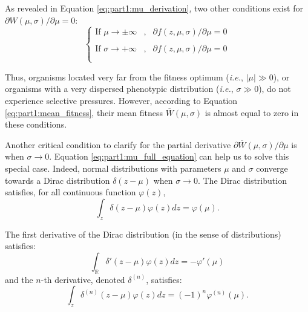 As revealed in Equation \ref{eq:part1:mu_derivation}, two other conditions exist for $\partial W(\mu,\sigma)/\partial \mu = 0$:
\begin{equation}
\left\{
\begin{array}{rcl}
\text{If } \mu \rightarrow \pm \infty &,& \partial f(z,\mu,\sigma)/\partial \mu = 0\\\\
\text{If } \sigma \rightarrow +\infty &,& \partial f(z,\mu,\sigma)/\partial \mu = 0\\\\
\end{array}
\right.
\end{equation}

Thus, organisms located very far from the fitness optimum (\textit{i.e.}, $|\mu| \gg 0$), or organisms with a very dispersed phenotypic distribution (\textit{i.e.}, $\sigma \gg 0$), do not experience selective pressures. However, according to Equation \ref{eq:part1:mean_fitness}, their mean fitness $\overline{W}(\mu, \sigma)$ is almost equal to zero in these conditions.

Another critical condition to clarify for the partial derivative $\partial \overline{W}(\mu,\sigma)/\partial \mu$ is when $\sigma \rightarrow 0$. Equation \ref{eq:part1:mu_full_equation} can help us to solve this special case. Indeed, normal distributions with parameters $\mu$ and $\sigma$ converge towards a Dirac distribution $\delta(z-\mu)$ when $\sigma \rightarrow 0$. The Dirac distribution satisfies, for all continuous function $\varphi(z)$,
\begin{equation}
\int_z \delta(z-\mu)\varphi(z)dz = \varphi(\mu).
\end{equation}

The first derivative of the Dirac distribution (in the sense of distributions) satisfies:
\begin{equation}
\displaystyle\int_{\mathbb{R}} \delta'(z-\mu)\varphi(z)dz = -\varphi'(\mu)
\end{equation}
and the $n$-th derivative, denoted $\delta^{(n)}$, satisfies:
\begin{equation}
\displaystyle\int_z \delta^{(n)}(z-\mu) \varphi(z) dz = (-1)^n \varphi^{(n)}(\mu).
\end{equation}
 
